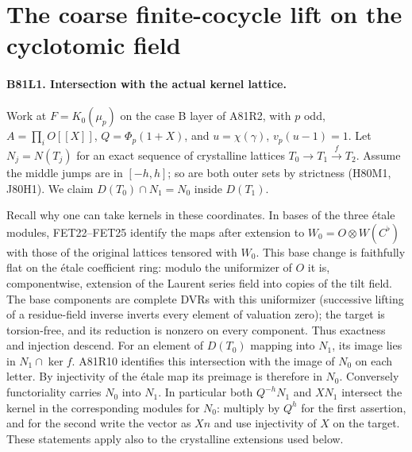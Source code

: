 \section{The coarse finite-cocycle lift on the cyclotomic field}

\paragraph{B81L1. Intersection with the actual kernel lattice.}
Work at $F=K_0(\mu_p)$ on the case B layer of A81R2, with $p$ odd,
$A=\prod_i O[[X]]$, $Q=\Phi_p(1+X)$, and $u=\chi(\gamma)$,
$v_p(u-1)=1$. Let $N_j=N(T_j)$ for an exact sequence of crystalline
lattices $T_0\to T_1\xrightarrow{f} T_2$. Assume the middle jumps are in
$[-h,h]$; so are both outer sets by strictness (H80M1, J80H1).
We claim $D(T_0)\cap N_1=N_0$ inside $D(T_1)$.

Recall why one can take kernels in these coordinates. In bases of
the three \'etale modules, FET22--FET25 identify the maps after
extension to $W_0=O\otimes W(C^\flat)$ with those of the original
lattices tensored with $W_0$. This base change is faithfully flat
on the \'etale coefficient ring: modulo the uniformizer of $O$ it
is, componentwise, extension of the Laurent series field into
copies of the tilt field. The base components are complete DVRs
with this uniformizer (successive lifting of a residue-field inverse
inverts every element of valuation zero); the target is torsion-free,
and its reduction is nonzero on every component. Thus exactness
and injection descend. For an element of $D(T_0)$ mapping into $N_1$, its image lies in
$N_1\cap\ker f$. A81R10 identifies this intersection with the image
of $N_0$ on each letter. By injectivity of the \'etale map its
preimage is therefore in $N_0$. Conversely functoriality carries
$N_0$ into $N_1$. In particular both $Q^{-h}N_1$ and $XN_1$
intersect the kernel in the corresponding modules for $N_0$:
multiply by $Q^h$ for the first assertion, and for the second
write the vector as $Xn$ and use injectivity of $X$ on the target.
These statements apply also to the crystalline extensions used below.

